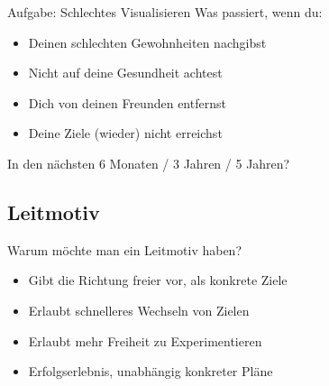 \begin{frame}[c]
    \begin{block}{Aufgabe: Schlechtes Visualisieren}
    Was passiert, wenn du:
    \begin{itemize}
        \item Deinen schlechten Gewohnheiten nachgibst
        \item Nicht auf deine Gesundheit achtest
        \item Dich von deinen Freunden entfernst
        \item Deine Ziele (wieder) nicht erreichst
    \end{itemize}
    \pause
    In den nächsten 6 Monaten / 3 Jahren / 5 Jahren?
    \end{block}
\end{frame}






\subsection{Leitmotiv}

\begin{frame}[c]{Warum möchte man ein Leitmotiv haben?}
    \large
    \begin{itemize}[<+(1)->]
        \item Gibt die Richtung freier vor, als konkrete Ziele
        \item Erlaubt schnelleres Wechseln von Zielen
        \item Erlaubt mehr Freiheit zu Experimentieren
        \item Erfolgserlebnis, unabhängig konkreter Pläne
    \end{itemize}
\end{frame}


